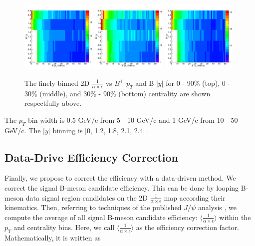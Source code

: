 \begin{figure}[h]
\begin{center}
\includegraphics[width= 0.32\textwidth]{Figures/Chapter5/BPEff2D_0_90.png}
\includegraphics[width= 0.32\textwidth]{Figures/Chapter5/BPEff2D_0_30.png}
\includegraphics[width= 0.32\textwidth]{Figures/Chapter5/BPEff2D_30_90.png}
\caption{The finely binned 2D $\frac{1}{\alpha \times \epsilon}$ vs $B^+$ $p_T$ and B $|y|$ for 0 - 90\% (top), 0 - 30\% (middle), and 30\% - 90\% (bottom) centrality are shown respectfully above.}
\label{BP2DMap}
\end{center}
\end{figure}

The $p_T$ bin width is 0.5 GeV/c from 5 - 10 GeV/c and 1 GeV/c from 10 - 50 GeV/c. The $|y|$ binning is [0, 1.2, 1.8, 2.1, 2.4].

\subsection{Data-Drive Efficiency Correction}

Finally, we propose to correct the efficiency with a data-driven method. We correct the signal B-meson candidate efficiency. This can be done by looping B-meson data signal region candidates on the 2D $\frac{1}{\alpha \times \epsilon}$ map according their kinematics. Then, referring to techniques of the published $J/\psi$ analysis \cite{DataAve}, we compute the average of all signal B-meson candidate efficiency: $\langle\frac{1}{\alpha \times \epsilon} \rangle$ within the $p_T$ and centrality bins. Here, we call $\langle\frac{1}{\alpha \times \epsilon} \rangle$ as the efficiency correction factor. Mathematically, it is written as

